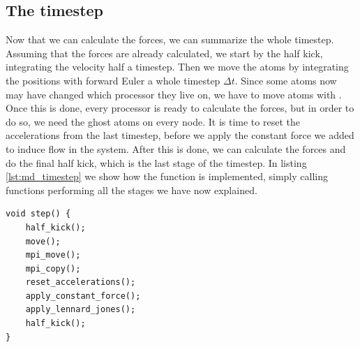 \subsection{The timestep}
Now that we can calculate the forces, we can summarize the whole timestep. Assuming that the forces are already calculated, we start by the half kick, integrating the velocity half a timestep. Then we move the atoms by integrating the positions with forward Euler a whole timestep $\Delta t$. Since some atoms now may have changed which processor they live on, we have to move atoms with . Once this is done, every processor is ready to calculate the forces, but in order to do so, we need the ghost atoms on every node. It is time to reset the accelerations from the last timestep, before we apply the constant force we added to induce flow in the system. After this is done, we can calculate the forces and do the final half kick, which is the last stage of the timestep. In listing \ref{lst:md_timestep} we show how the  function is implemented, simply calling functions performing all the stages we have now explained.
\begin{lstlisting}[caption=Code showing the stages during a timestep., label=lst:md_timestep]
void step() {
    half_kick();
    move();
    mpi_move();
    mpi_copy();
    reset_accelerations();
    apply_constant_force();
    apply_lennard_jones();
    half_kick();
}
\end{lstlisting}